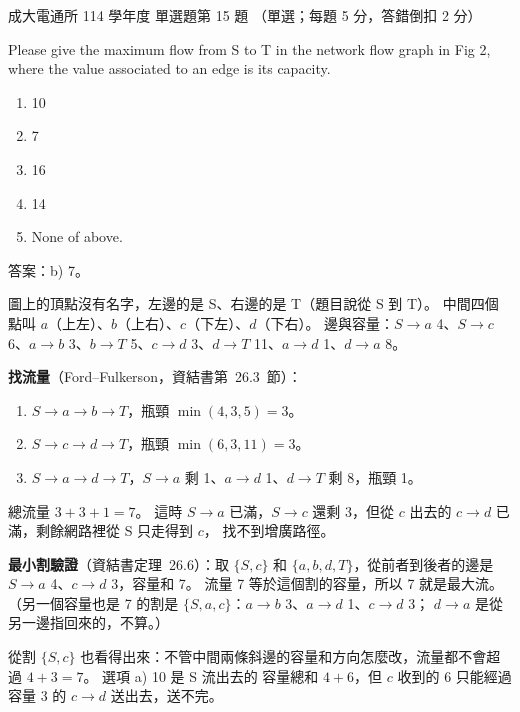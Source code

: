 \begin{pastexam}[label={px:ncku-114-cce-ds-15}]{成大電通所 114 學年度 單選題第 15 題}
（單選；每題 5 分，答錯倒扣 2 分）

Please give the maximum flow from S to T in the network flow graph in Fig 2, where the value associated to an
edge is its capacity.

\begin{center}
\end{center}
\begin{enumerate}[label=\alph*),nosep]
\item 10
\item 7
\item 16
\item 14
\item None of above.
\end{enumerate}
\end{pastexam}

\begin{pastsoln}
答案：b) 7。

圖上的頂點沒有名字，左邊的是 S、右邊的是 T（題目說從 S 到 T）。 中間四個點叫 $a$（上左）、$b$（上右）、$c$（下左）、$d$（下右）。
邊與容量：$S \to a$ 4、$S \to c$ 6、$a \to b$ 3、$b \to T$ 5、$c \to d$ 3、$d \to T$ 11、$a \to d$ 1、$d \to a$ 8。

\textbf{找流量}（Ford--Fulkerson，資結書第~26.3~節）：
\begin{enumerate}[nosep]
\item $S \to a \to b \to T$，瓶頸 $\min(4, 3, 5) = 3$。
\item $S \to c \to d \to T$，瓶頸 $\min(6, 3, 11) = 3$。
\item $S \to a \to d \to T$，$S \to a$ 剩 1、$a \to d$ 1、$d \to T$ 剩 8，瓶頸 1。
\end{enumerate}
總流量 $3 + 3 + 1 = 7$。 這時 $S \to a$ 已滿，$S \to c$ 還剩 3，但從 $c$ 出去的 $c \to d$ 已滿，剩餘網路裡從 S 只走得到 $c$，
找不到增廣路徑。

\textbf{最小割驗證}（資結書定理~26.6）：取 $\{S, c\}$ 和 $\{a, b, d, T\}$，從前者到後者的邊是 $S \to a$ 4、$c \to d$ 3，容量和 7。
流量 7 等於這個割的容量，所以 7 就是最大流。 （另一個容量也是 7 的割是 $\{S, a, c\}$：$a \to b$ 3、$a \to d$ 1、$c \to d$ 3；
$d \to a$ 是從另一邊指回來的，不算。）

從割 $\{S, c\}$ 也看得出來：不管中間兩條斜邊的容量和方向怎麼改，流量都不會超過 $4 + 3 = 7$。 選項 a) 10 是 S 流出去的
容量總和 $4 + 6$，但 $c$ 收到的 6 只能經過容量 3 的 $c \to d$ 送出去，送不完。
\end{pastsoln}
